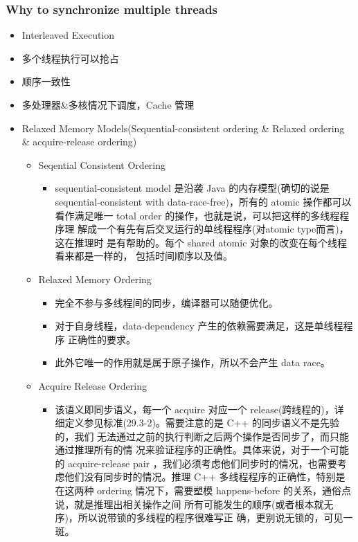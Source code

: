 \documentclass[a4paper, 11pt]{article}
\begin{document}
\subsubsection{Why to synchronize multiple threads}
\begin{itemize}
  \item{Interleaved Execution}
  \item{多个线程执行可以抢占}
  \item{顺序一致性}
  \item{多处理器\&多核情况下调度，Cache 管理}
  \item{Relaxed Memory Models(Sequential-consistent ordering \& Relaxed
	ordering \& acquire-release ordering)}
	\begin{itemize}
	  \item{Seqential Consistent Ordering}
		\begin{itemize}
		  \item{sequential-consistent model 是沿袭 Java 的内存模型(确切的说是
			sequential-consistent with data-race-free)，所有的 atomic 操作都可以
			看作满足唯一 total order 的操作，也就是说，可以把这样的多线程程序理
			解成一个有先有后交叉运行的单线程程序(对atomic type而言)，这在推理时
			是有帮助的。每个 shared atomic 对象的改变在每个线程看来都是一样的，
			包括时间顺序以及值。}
		  \end{itemize}
	  \end{itemize}

	\begin{itemize}
	  \item{Relaxed Memory Ordering}
		\begin{itemize}
		  \item{完全不参与多线程间的同步，编译器可以随便优化。}
		  \item{对于自身线程，data-dependency 产生的依赖需要满足，这是单线程程序
			正确性的要求。}
		  \item{此外它唯一的作用就是属于原子操作，所以不会产生 data race。}
			
		  \end{itemize}
	  \end{itemize}

	\begin{itemize}
	  \item{Acquire Release Ordering}
		\begin{itemize}
		  \item{该语义即同步语义，每一个 acquire 对应一个 release(跨线程的)，详
			细定义参见标准(29.3-2)。需要注意的是 C++ 的同步语义不是先验的，我们
			无法通过之前的执行判断之后两个操作是否同步了，而只能通过推理所有的情
			况来验证程序的正确性。具体来说，对于一个可能的 acquire-release pair
			，我们必须考虑他们同步时的情况，也需要考虑他们没有同步时的情况。推理
			C++ 多线程程序的正确性，特别是在这两种 ordering 情况下，需要塑模
			happens-before 的关系，通俗点说，就是推理出相关操作之间
			所有可能发生的顺序(或者根本就无序)，所以说带锁的多线程的程序很难写正
			确，更别说无锁的，可见一斑。}
		  \end{itemize}
	  \end{itemize}
  \end{itemize}
\end{document}

